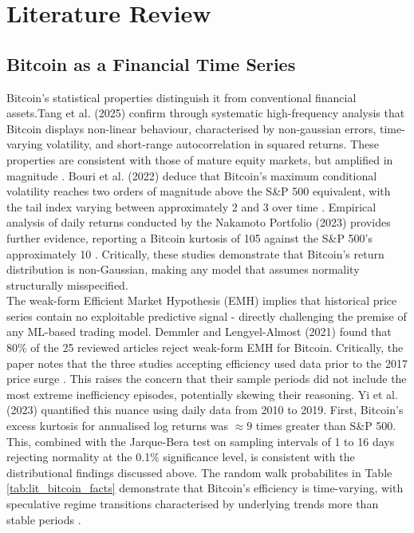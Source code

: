 \section{Literature Review}
\label{sec: Literature Review}
\subsection{Bitcoin as a Financial Time Series}
Bitcoin’s statistical properties distinguish it from conventional financial assets.Tang et al. (2025) confirm through systematic high-frequency analysis that Bitcoin displays non-linear behaviour, characterised by non-gaussian errors, time-varying volatility, and short-range autocorrelation in squared returns. These properties are consistent with those of mature equity markets, but amplified in magnitude \cite{tangStylizedFactsHighFrequency2025}. Bouri et al. (2022) deduce that Bitcoin's maximum conditional volatility reaches two orders of magnitude above the S\&P 500 equivalent, with the tail index varying between approximately 2 and 3 over time \cite{bouriBitcoinSP500Comovements2022}. Empirical analysis of daily returns conducted by the Nakamoto Portfolio (2023) provides further evidence, reporting a Bitcoin kurtosis of 105 against the S\&P 500's approximately 10 \cite{BitcoinHistoricalReturns}. Critically, these studies demonstrate that Bitcoin's return distribution is non-Gaussian, making any model that assumes normality structurally misspecified.\\
\noindent The weak-form Efficient Market Hypothesis (EMH) implies that historical price series contain no exploitable predictive signal - directly challenging the premise of any ML-based trading model. Demmler and Lengyel-Almost (2021) found that 80\% of the 25 reviewed articles reject weak-form EMH for Bitcoin. Critically, the paper notes that the three studies accepting efficiency used data prior to the 2017 price surge \cite{lengyel-almosBitcoinMarketEfficient2021}. This raises the concern that their sample periods did not include the most extreme inefficiency episodes, potentially skewing their reasoning. Yi et al. (2023) quantified this nuance using daily data from 2010 to 2019. First, Bitcoin's excess kurtosis for annualised log returns was $\approx9$ times greater than S\&P 500. This, combined with the Jarque-Bera test on sampling intervals of 1 to 16 days rejecting normality at the 0.1\% significance level, is consistent with the distributional findings discussed above. The random walk probabilites in Table \ref{tab:lit_bitcoin_facts} demonstrate that Bitcoin's efficiency is time-varying, with speculative regime transitions characterised by underlying trends more than stable periods \cite{yiMarketEfficiencyCryptocurrency2023}.
